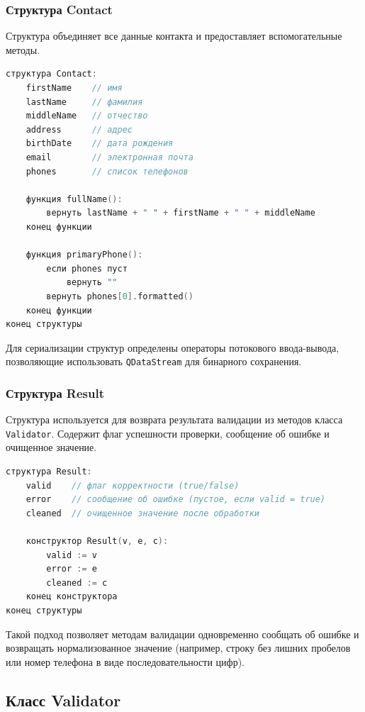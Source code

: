 \subsubsection*{Структура Contact}

Структура объединяет все данные контакта и предоставляет вспомогательные методы.

\begin{lstlisting}[language=C, caption=Структура Contact]
структура Contact:
    firstName    // имя
    lastName     // фамилия
    middleName   // отчество
    address      // адрес
    birthDate    // дата рождения
    email        // электронная почта
    phones       // список телефонов
    
    функция fullName():
        вернуть lastName + " " + firstName + " " + middleName
    конец функции
    
    функция primaryPhone():
        если phones пуст
            вернуть ""
        вернуть phones[0].formatted()
    конец функции
конец структуры
\end{lstlisting}

Для сериализации структур определены операторы потокового ввода-вывода, позволяющие использовать \texttt{QDataStream} для бинарного сохранения.

\subsubsection*{Структура Result}

Структура используется для возврата результата валидации из методов класса \texttt{Validator}. Содержит флаг успешности проверки, сообщение об ошибке и очищенное значение.

\begin{lstlisting}[language=C, caption=Структура Result]
структура Result:
    valid    // флаг корректности (true/false)
    error    // сообщение об ошибке (пустое, если valid = true)
    cleaned  // очищенное значение после обработки
    
    конструктор Result(v, e, c):
        valid := v
        error := e
        cleaned := c
    конец конструктора
конец структуры
\end{lstlisting}

Такой подход позволяет методам валидации одновременно сообщать об ошибке и возвращать нормализованное значение (например, строку без лишних пробелов или номер телефона в виде последовательности цифр).

\subsection{Класс Validator}


